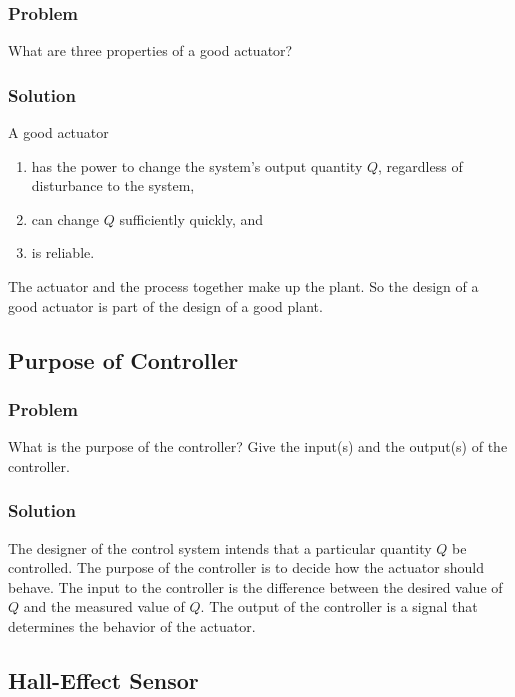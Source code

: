 \subsubsection{Problem}

What are three properties of a good actuator?

\subsubsection{Solution}

A good actuator
\begin{enumerate}
   \item has the power to change the system's output quantity $Q$, regardless
      of disturbance to the system,
   \item can change $Q$ sufficiently quickly, and
   \item is reliable.
\end{enumerate}
The actuator and the process together make up the plant. So the design of a
good actuator is part of the design of a good plant.

\subsection{Purpose of Controller}

\subsubsection{Problem}

What is the purpose of the controller? Give the input(s) and the output(s) of
the controller.

\subsubsection{Solution}

The designer of the control system intends that a particular quantity $Q$ be
controlled. The purpose of the controller is to decide how the actuator should
behave. The input to the controller is the difference between the desired value
of $Q$ and the measured value of $Q$.  The output of the controller is a signal
that determines the behavior of the actuator.

\subsection{Hall-Effect Sensor}

